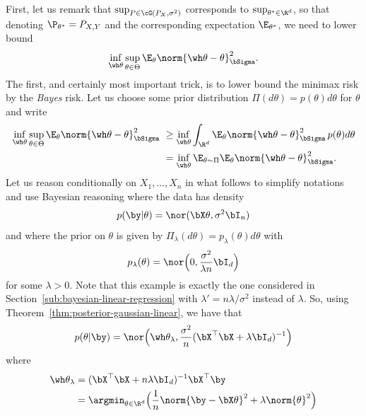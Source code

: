 First, let us remark that $\sup_{P \in \cG(P_X, \sigma^2)}$ corresponds to $\sup_{\theta^* \in \R^d}$, so that denoting $\P_{\theta^*} = P_{X, Y}$ and the corresponding expectation $\E_{\theta^*}$, we need to lower bound
\begin{equation*}
	\inf_{\wh \theta} \sup_{\theta \in \Theta} \E_\theta \norm{\wh \theta - \theta}_{\bSigma}^2.
\end{equation*}
The first, and certainly most important trick, is to lower bound the minimax risk by the \emph{Bayes} risk. 
Let us choose some prior distribution $\Pi(d \theta) = p(\theta) d \theta$ for $\theta$ and write
\begin{align}
	\nonumber
	\inf_{\wh \theta} \sup_{\theta \in \Theta} \E_\theta \norm{\wh \theta - \theta}_{\bSigma}^2 
	&\geq \inf_{\wh \theta} \int_{\R^d} \E_\theta \norm{\wh \theta - \theta}_{\bSigma}^2 \, p(\theta) d \theta \\
	\label{eq:ls-bayes-risk}
	&= \inf_{\wh \theta} \E_{\theta \sim \Pi} \E_\theta \norm{\wh \theta - \theta}_{\bSigma}^2.
\end{align}
Let us reason conditionally on $X_1, \ldots, X_n$ in what follows to simplify notations and use Bayesian reasoning where the data has density 
\begin{equation*}
	p(\by | \theta) = \nor(\bX \theta, \sigma^2 \bI_n)
\end{equation*}
and where the prior on $\theta$ is given by $\Pi_\lambda(d \theta) = p_\lambda(\theta) d\theta$ with
\begin{equation*}
	p_\lambda(\theta) = \nor\Big(0, \frac{\sigma^2}{\lambda n} \bI_d \Big)
\end{equation*}
for some $\lambda > 0$. Note that this example is exactly the one considered in Section~\ref{sub:bayesian-linear-regression} with $\lambda' = n \lambda / \sigma^2$ instead of $\lambda$.
So, using Theorem~\ref{thm:posterior-gaussian-linear}, we have that
\begin{equation*}
	p(\theta | \by) = \nor\Big( \wh \theta_\lambda, \frac{\sigma^2}{n} (\bX^\top \bX + \lambda \bI_d)^{-1} \Big)
\end{equation*}
where
\begin{equation}
	\label{eq:ridge-estimator-lower-bound}
	\begin{split}
		\wh \theta_\lambda &= (\bX^\top \bX + n \lambda \bI_d)^{-1} \bX^\top \by \\
		&= \argmin_{\theta \in \R^d} \Big( \frac 1n \norm{\by - \bX \theta}^2 + \lambda \norm{\theta}^2 \Big)		
	\end{split}
\end{equation}
